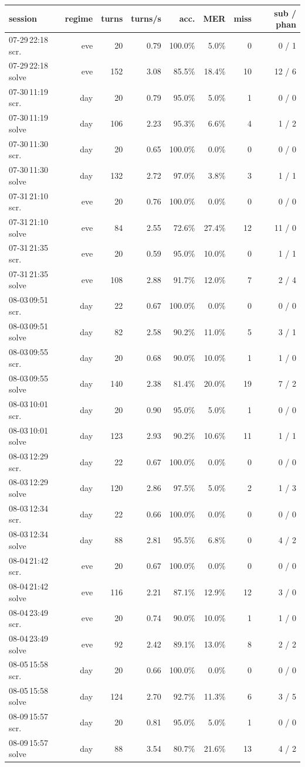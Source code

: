 \begin{tabular}{@{}lrrrrrrr@{}}
\toprule
session & regime & turns & turns/s & acc. & MER & miss & sub / phan \\
\midrule
07-29\,22:18 scr. & eve & 20 & 0.79 & 100.0\% & 5.0\% & 0 & 0 / 1 \\
07-29\,22:18 solve & eve & 152 & 3.08 & 85.5\% & 18.4\% & 10 & 12 / 6 \\
07-30\,11:19 scr. & day & 20 & 0.79 & 95.0\% & 5.0\% & 1 & 0 / 0 \\
07-30\,11:19 solve & day & 106 & 2.23 & 95.3\% & 6.6\% & 4 & 1 / 2 \\
07-30\,11:30 scr. & day & 20 & 0.65 & 100.0\% & 0.0\% & 0 & 0 / 0 \\
07-30\,11:30 solve & day & 132 & 2.72 & 97.0\% & 3.8\% & 3 & 1 / 1 \\
07-31\,21:10 scr. & eve & 20 & 0.76 & 100.0\% & 0.0\% & 0 & 0 / 0 \\
07-31\,21:10 solve & eve & 84 & 2.55 & 72.6\% & 27.4\% & 12 & 11 / 0 \\
07-31\,21:35 scr. & eve & 20 & 0.59 & 95.0\% & 10.0\% & 0 & 1 / 1 \\
07-31\,21:35 solve & eve & 108 & 2.88 & 91.7\% & 12.0\% & 7 & 2 / 4 \\
08-03\,09:51 scr. & day & 22 & 0.67 & 100.0\% & 0.0\% & 0 & 0 / 0 \\
08-03\,09:51 solve & day & 82 & 2.58 & 90.2\% & 11.0\% & 5 & 3 / 1 \\
08-03\,09:55 scr. & day & 20 & 0.68 & 90.0\% & 10.0\% & 1 & 1 / 0 \\
08-03\,09:55 solve & day & 140 & 2.38 & 81.4\% & 20.0\% & 19 & 7 / 2 \\
08-03\,10:01 scr. & day & 20 & 0.90 & 95.0\% & 5.0\% & 1 & 0 / 0 \\
08-03\,10:01 solve & day & 123 & 2.93 & 90.2\% & 10.6\% & 11 & 1 / 1 \\
08-03\,12:29 scr. & day & 22 & 0.67 & 100.0\% & 0.0\% & 0 & 0 / 0 \\
08-03\,12:29 solve & day & 120 & 2.86 & 97.5\% & 5.0\% & 2 & 1 / 3 \\
08-03\,12:34 scr. & day & 22 & 0.66 & 100.0\% & 0.0\% & 0 & 0 / 0 \\
08-03\,12:34 solve & day & 88 & 2.81 & 95.5\% & 6.8\% & 0 & 4 / 2 \\
08-04\,21:42 scr. & eve & 20 & 0.67 & 100.0\% & 0.0\% & 0 & 0 / 0 \\
08-04\,21:42 solve & eve & 116 & 2.21 & 87.1\% & 12.9\% & 12 & 3 / 0 \\
08-04\,23:49 scr. & eve & 20 & 0.74 & 90.0\% & 10.0\% & 1 & 1 / 0 \\
08-04\,23:49 solve & eve & 92 & 2.42 & 89.1\% & 13.0\% & 8 & 2 / 2 \\
08-05\,15:58 scr. & day & 20 & 0.66 & 100.0\% & 0.0\% & 0 & 0 / 0 \\
08-05\,15:58 solve & day & 124 & 2.70 & 92.7\% & 11.3\% & 6 & 3 / 5 \\
08-09\,15:57 scr. & day & 20 & 0.81 & 95.0\% & 5.0\% & 1 & 0 / 0 \\
08-09\,15:57 solve & day & 88 & 3.54 & 80.7\% & 21.6\% & 13 & 4 / 2 \\
\bottomrule
\end{tabular}
